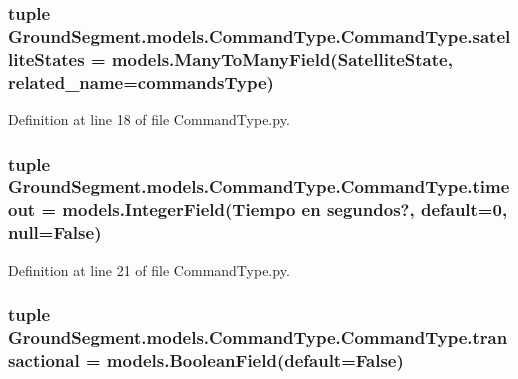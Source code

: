 \subsubsection[{satellite\+States}]{\setlength{\rightskip}{0pt plus 5cm}tuple Ground\+Segment.\+models.\+Command\+Type.\+Command\+Type.\+satellite\+States = models.\+Many\+To\+Many\+Field({\bf Satellite\+State}, related\+\_\+name=\textquotesingle{}commands\+Type\textquotesingle{})\hspace{0.3cm}{\ttfamily [static]}}\label{class_ground_segment_1_1models_1_1_command_type_1_1_command_type_a7d70980b38a0c4a182eb5eaf5e03a682}


Definition at line 18 of file Command\+Type.\+py.

\hypertarget{class_ground_segment_1_1models_1_1_command_type_1_1_command_type_a3b7254a7759af25a5d8f1766a4c868b4}{}
\subsubsection[{timeout}]{\setlength{\rightskip}{0pt plus 5cm}tuple Ground\+Segment.\+models.\+Command\+Type.\+Command\+Type.\+timeout = models.\+Integer\+Field(\textquotesingle{}Tiempo en segundos?\textquotesingle{}, default=0, null=False)\hspace{0.3cm}{\ttfamily [static]}}\label{class_ground_segment_1_1models_1_1_command_type_1_1_command_type_a3b7254a7759af25a5d8f1766a4c868b4}


Definition at line 21 of file Command\+Type.\+py.

\hypertarget{class_ground_segment_1_1models_1_1_command_type_1_1_command_type_a3cda63f48be91dcfde6d1ca9aa4cabec}{}
\subsubsection[{transactional}]{\setlength{\rightskip}{0pt plus 5cm}tuple Ground\+Segment.\+models.\+Command\+Type.\+Command\+Type.\+transactional = models.\+Boolean\+Field(default=False)\hspace{0.3cm}{\ttfamily [static]}}\label{class_ground_segment_1_1models_1_1_command_type_1_1_command_type_a3cda63f48be91dcfde6d1ca9aa4cabec}


